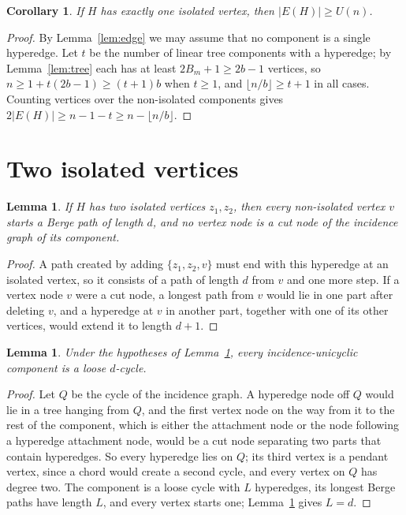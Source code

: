 \documentclass[11pt]{article}
\newtheorem{lemma}[theorem]{Lemma}
\newtheorem{corollary}[theorem]{Corollary}
\theoremstyle{definition}
\theoremstyle{remark}
\begin{document}
\begin{corollary}\label{cor:one}
If $H$ has exactly one isolated vertex, then $|E(H)|\ge U(n)$.
\end{corollary}

\begin{proof}
By Lemma~\ref{lem:edge} we may assume that no component is a single
hyperedge. Let $t$ be the number of linear tree components with a
hyperedge; by Lemma~\ref{lem:tree} each has at least $2B_m+1\ge 2b-1$
vertices, so $n\ge 1+t(2b-1)\ge(t+1)b$ when $t\ge1$, and
$\lfloor n/b\rfloor\ge t+1$ in all cases. Counting vertices over the
non-isolated components gives $2|E(H)|\ge n-1-t\ge n-\lfloor n/b\rfloor$.
\end{proof}

\section{Two isolated vertices}

\begin{lemma}\label{lem:long}
If $H$ has two isolated vertices $z_1,z_2$, then every non-isolated vertex
$v$ starts a Berge path of length $d$, and no vertex node is a cut node of
the incidence graph of its component.
\end{lemma}

\begin{proof}
A path created by adding $\{z_1,z_2,v\}$ must end with this hyperedge at
an isolated vertex, so it consists of a path of length $d$ from $v$ and one
more step. If a vertex node $v$ were a cut node, a longest path from $v$
would lie in one part after deleting $v$, and a hyperedge at $v$ in another
part, together with one of its other vertices, would extend it to length
$d+1$.
\end{proof}

\begin{lemma}\label{lem:rigid}
Under the hypotheses of Lemma~\ref{lem:long}, every incidence-unicyclic
component is a loose $d$-cycle.
\end{lemma}

\begin{proof}
Let $Q$ be the cycle of the incidence graph. A hyperedge node off $Q$ would
lie in a tree hanging from $Q$, and the first vertex node on the way from
it to the rest of the component, which is either the attachment node or the
node following a hyperedge attachment node, would be a cut node separating
two parts that contain hyperedges. So every hyperedge lies on $Q$; its
third vertex is a pendant vertex, since a chord would create a second
cycle, and every vertex on $Q$ has degree two. The component is a loose
cycle with $L$ hyperedges, its longest Berge paths have length $L$, and
every vertex starts one; Lemma~\ref{lem:long} gives $L=d$.
\end{proof}
\end{document}

